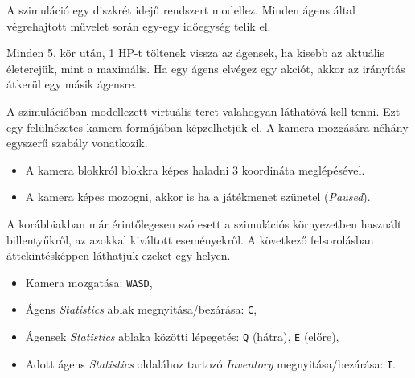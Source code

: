 \label{time}

A szimuláció egy diszkrét idejű rendszert modellez. Minden ágens által végrehajtott művelet során egy-egy időegység telik el.

Minden 5. kör után, 1 HP-t töltenek vissza az ágensek, ha kisebb az aktuális életerejük, mint a maximális.
Ha egy ágens elvégez egy akciót, akkor az irányítás átkerül egy másik ágensre.


A szimulációban modellezett virtuális teret valahogyan láthatóvá kell tenni. Ezt egy felülnézetes kamera formájában képzelhetjük el. A kamera mozgására néhány egyszerű szabály vonatkozik.
\begin{itemize}
    \item A kamera blokkról blokkra képes haladni 3 koordináta meglépésével.
    \item A kamera képes mozogni, akkor is ha a játékmenet szünetel (\textit{Paused}).
\end{itemize}


A korábbiakban már érintőlegesen szó esett a szimulációs környezetben használt billentyűkről, az azokkal kiváltott eseményekről. A következő felsorolásban áttekintésképpen láthatjuk ezeket egy helyen.
\begin{itemize}
    \item Kamera mozgatása: \texttt{WASD},
    \item Ágens \textit{Statistics} ablak megnyitása/bezárása: \texttt{C},
    \item Ágensek \textit{Statistics} ablaka közötti lépegetés: \texttt{Q} (hátra), \texttt{E} (előre),
    \item Adott ágens \textit{Statistics} oldalához tartozó \textit{Inventory} megnyitása/bezárása: \texttt{I}.
\end{itemize}








